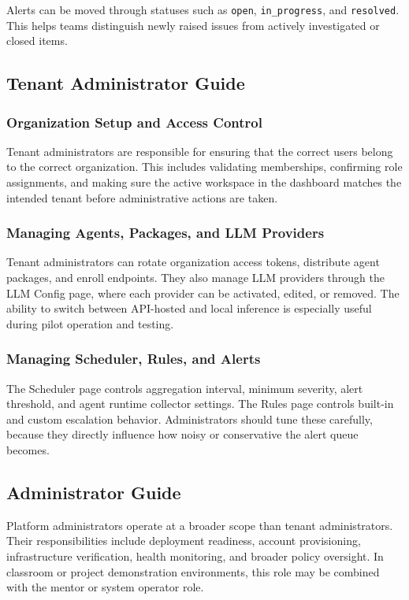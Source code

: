 \documentclass[12pt,a4paper]{article}
\begin{document}
Alerts can be moved through statuses such as \texttt{open}, \texttt{in\_progress}, and \texttt{resolved}. This helps teams distinguish newly raised issues from actively investigated or closed items.

\subsection{Tenant Administrator Guide}

\subsubsection{Organization Setup and Access Control}
Tenant administrators are responsible for ensuring that the correct users belong to the correct organization. This includes validating memberships, confirming role assignments, and making sure the active workspace in the dashboard matches the intended tenant before administrative actions are taken.

\subsubsection{Managing Agents, Packages, and LLM Providers}
Tenant administrators can rotate organization access tokens, distribute agent packages, and enroll endpoints. They also manage LLM providers through the LLM Config page, where each provider can be activated, edited, or removed. The ability to switch between API-hosted and local inference is especially useful during pilot operation and testing.

\subsubsection{Managing Scheduler, Rules, and Alerts}
The Scheduler page controls aggregation interval, minimum severity, alert threshold, and agent runtime collector settings. The Rules page controls built-in and custom escalation behavior. Administrators should tune these carefully, because they directly influence how noisy or conservative the alert queue becomes.

\subsection{Administrator Guide}
Platform administrators operate at a broader scope than tenant administrators. Their responsibilities include deployment readiness, account provisioning, infrastructure verification, health monitoring, and broader policy oversight. In classroom or project demonstration environments, this role may be combined with the mentor or system operator role.
\end{document}
